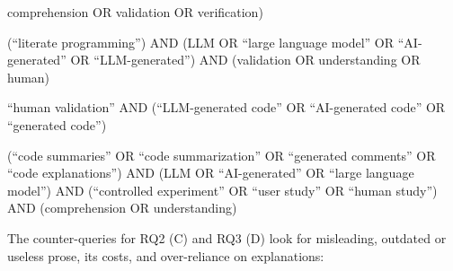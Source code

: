 \begin{description}
    comprehension OR validation OR verification)
  \item[H4] (\enquote{literate programming}) AND (LLM OR \enquote{large
    language model} OR \enquote{AI-generated} OR \enquote{LLM-generated}) AND
    (validation OR understanding OR human)
  \item[H5] \enquote{human validation} AND (\enquote{LLM-generated code} OR
    \enquote{AI-generated code} OR \enquote{generated code})
  \item[H6] (\enquote{code summaries} OR \enquote{code summarization} OR
    \enquote{generated comments} OR \enquote{code explanations}) AND (LLM OR
    \enquote{AI-generated} OR \enquote{large language model}) AND
    (\enquote{controlled experiment} OR \enquote{user study} OR \enquote{human
    study}) AND (comprehension OR understanding)
\end{description}
The counter-queries for RQ2 (C) and RQ3 (D) look for misleading, outdated or
useless prose, its costs, and over-reliance on explanations:

